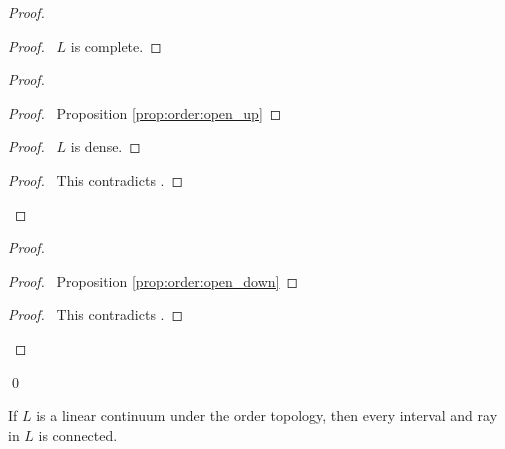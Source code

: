 \begin{proof}
  \pf
  \begin{proof}
    \pf\ $L$ is complete.
  \end{proof}
  \begin{proof}
    \step{<2>2}{\pick\ $u > s$ such that $[s,u) \subseteq U$}
    \begin{proof}
      \pf\ Proposition \ref{prop:order:open_up}
    \end{proof}
    \begin{proof}
      \pf\ $L$ is dense.
    \end{proof}
    \qedstep
    \begin{proof}
      \pf\ This contradicts .
    \end{proof}
  \end{proof}
  \begin{proof}
    \step{<2>2}{\pick\ $u < s$ such that $(u,s] \subseteq V$}
    \begin{proof}
      \pf\ Proposition \ref{prop:order:open_down}
    \end{proof}
    \qedstep
    \begin{proof}
      \pf\ This contradicts .
    \end{proof}
  \end{proof}
  \qed
\end{proof}

\begin{cor}
  If $L$ is a linear continuum under the order topology, then every interval and ray in $L$ is connected.
\end{cor}

